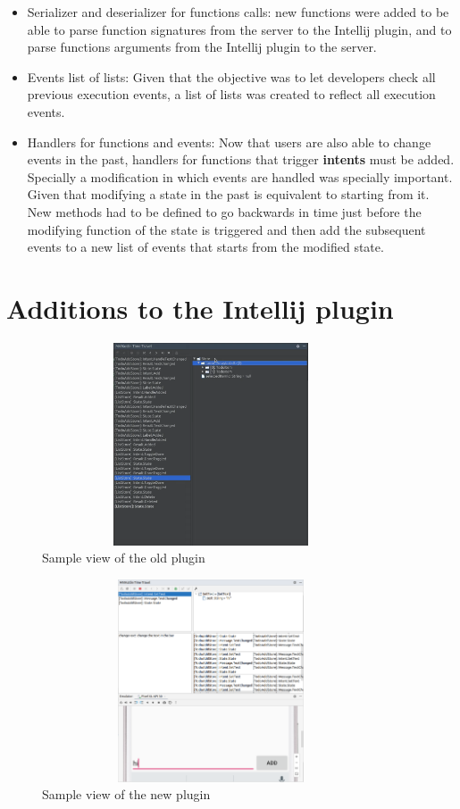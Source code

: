 \begin{itemize}
	\item Serializer and deserializer for functions calls: new functions were added to be able to parse function signatures from the server to the Intellij plugin, and to parse functions arguments from the Intellij plugin to the server.
	\item Events list of lists: Given that the objective was to let developers check all previous execution events, a list of lists was created to reflect all execution events.
	\item Handlers for functions and events: Now that users are also able to change events in the past, handlers for functions that trigger \textbf{intents} must be added. Specially a modification in which events are handled was specially important. Given that modifying a state in the past is equivalent to starting from it. New methods had to be defined to go backwards in time just before the modifying function of the state is triggered and then add the subsequent events to a new list of events that starts from the modified state.
\end{itemize}

\section{Additions to the Intellij plugin}

\begin{figure}[h]
\centering
\includegraphics[height=6cm,width=10cm]{figures/oldPlugin}
\caption{Sample view of the old plugin}
\label{fig: Sample view of the old plugin}
\end{figure}

\begin{figure}[h]
\centering
\includegraphics[height=6cm,width=10cm]{figures/plugin}
\caption{Sample view of the new plugin}
\label{fig: Sample view of the new plugin}
\end{figure}

